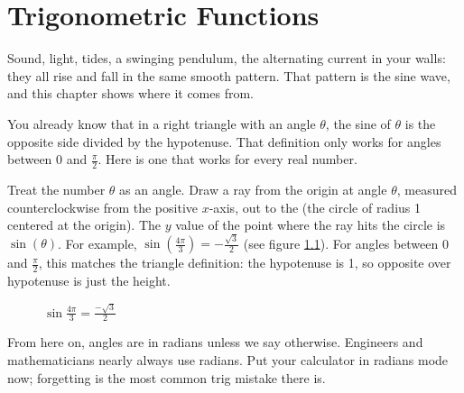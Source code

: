 \chapter{Trigonometric Functions}

Sound, light, tides, a swinging pendulum, the alternating current in your
walls: they all rise and fall in the same smooth pattern. That pattern is
the sine wave, and this chapter shows where it comes from.

You already know that in a right triangle with an angle $\theta$, the
sine of $\theta$ is the opposite side divided by the
hypotenuse. That definition only works for angles between 0 and
$\frac{\pi}{2}$. Here is one that works for every real number.

Treat the number $\theta$ as an angle. Draw a ray from the origin at angle
$\theta$, measured counterclockwise from the positive $x$-axis, out to the
 (the circle of radius 1 centered
at the origin). The $y$ value of the point where the ray hits the circle is
$\sin(\theta)$. For example, $\sin(\frac{4\pi}{3}) = -\frac{\sqrt{3}}{2}$
(see figure \ref{fig:sine}). For angles between 0 and $\frac{\pi}{2}$, this
matches the triangle definition: the hypotenuse is 1, so opposite over
hypotenuse is just the height.

\begin{figure}[H]
\centering
{}
\caption{$\sin{\frac{4\pi}{3}} = \frac{-\sqrt{3}}{2}$}
\label{fig:sine}
\end{figure}


From here on, angles are in radians unless we say otherwise. Engineers and
mathematicians nearly always use radians. Put your calculator in radians
mode now; forgetting is the most common trig mistake there is.


